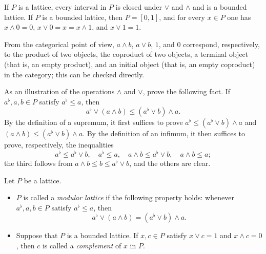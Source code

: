 If $P$ is a lattice, every interval in $P$ is closed under $\vee$ and
$\wedge$ and is a bounded lattice. If $P$ is a bounded lattice, then
$P=[0,1]$, and for every $x\in P$ one has
$x\wedge0=0$, $x\vee0=x=x\wedge1$, and $x\vee1=1$.

From the categorical point of view, $a\wedge b$, $a\vee b$, $1$, and $0$
correspond, respectively, to the product of two objects, the coproduct of two
objects, a terminal object (that is, an empty product), and an initial object
(that is, an empty coproduct) in the category; this can be checked directly.

As an illustration of the operations $\wedge$ and $\vee$, prove the following
fact. If $a^\flat,a,b\in P$ satisfy $a^\flat\leq a$, then
\begin{equation}\label{eqn:modular-inequality}
	a^\flat \vee (a \wedge b) \leq (a^\flat \vee b) \wedge a.
\end{equation}
By the definition of a supremum, it first suffices to prove
$a^\flat\leq(a^\flat\vee b)\wedge a$ and
$(a\wedge b)\leq(a^\flat\vee b)\wedge a$. By the definition of an infimum,
it then suffices to prove, respectively, the inequalities
\[ a^\flat \leq a^\flat \vee b, \quad a^\flat \leq a, \quad a \wedge b \leq a^\flat \vee b, \quad a \wedge b \leq a; \]
the third follows from $a\wedge b\leq b\leq a^\flat\vee b$, and the others
are clear.

\begin{definition}\label{def:modular-lattice}
	Let $P$ be a lattice.
	\begin{itemize}
		\item $P$ is called a \emph{modular lattice} if the following property
		holds: whenever $a^\flat,a,b\in P$ satisfy $a^\flat\leq a$, then
		\[ a^\flat \vee (a \wedge b) = (a^\flat \vee b) \wedge a. \]
		\item Suppose that $P$ is a bounded lattice. If $x,c\in P$ satisfy
		$x\vee c=1$ and $x\wedge c=0$, then $c$ is called a \emph{complement} of
		$x$ in $P$.
	\end{itemize}
\end{definition}

